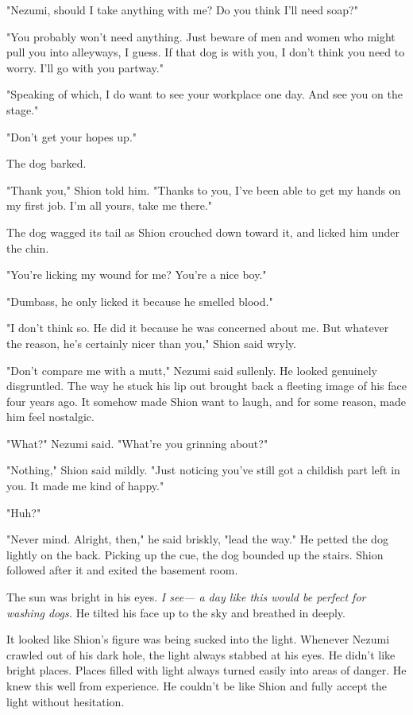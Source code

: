 "Nezumi, should I take anything with me? Do you think I'll need soap?"

"You probably won't need anything. Just beware of men and women who
might pull you into alleyways, I guess. If that dog is with you, I don't
think you need to worry. I'll go with you partway."

"Speaking of which, I do want to see your workplace one day. And see you
on the stage."

"Don't get your hopes up."

The dog barked.

"Thank you," Shion told him. "Thanks to you, I've been able to get my
hands on my first job. I'm all yours, take me there."

The dog wagged its tail as Shion crouched down toward it, and licked him
under the chin.

"You're licking my wound for me? You're a nice boy."

"Dumbass, he only licked it because he smelled blood."

"I don't think so. He did it because he was concerned about me. But
whatever the reason, he's certainly nicer than you," Shion said wryly.

"Don't compare me with a mutt," Nezumi said sullenly. He looked
genuinely disgruntled. The way he stuck his lip out brought back a
fleeting image of his face four years ago. It somehow made Shion want to
laugh, and for some reason, made him feel nostalgic.

"What?" Nezumi said. "What're you grinning about?"

"Nothing," Shion said mildly. "Just noticing you've still got a childish
part left in you. It made me kind of happy."

"Huh?"

"Never mind. Alright, then," he said briskly, "lead the way." He petted
the dog lightly on the back. Picking up the cue, the dog bounded up the
stairs. Shion followed after it and exited the basement room.

The sun was bright in his eyes.\emph{ I see--- a day like this would be perfect
for washing dogs.} He tilted his face up to the sky and breathed in
deeply.

\myspace

It looked like Shion's figure was being sucked into the light. Whenever
Nezumi crawled out of his dark hole, the light always stabbed at his
eyes. He didn't like bright places. Places filled with light always
turned easily into areas of danger. He knew this well from experience.
He couldn't be like Shion and fully accept the light without hesitation.

